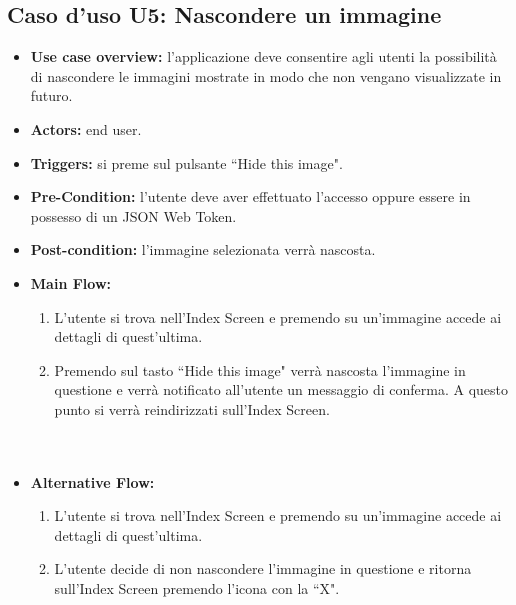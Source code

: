 \subsection*{Caso d'uso U5: Nascondere un immagine}
\begin{itemize}
    \item  \textbf{Use case overview:} l'applicazione deve consentire agli utenti la possibilit\`a di nascondere le immagini mostrate in modo che non vengano visualizzate in futuro.
    \item \textbf{Actors:} end user.
    \item \textbf{Triggers:} si preme sul pulsante ``Hide this image".
    \item \textbf{Pre-Condition:} l'utente deve aver effettuato l'accesso oppure essere in possesso di un JSON Web Token.
    \item \textbf{Post-condition:} l'immagine selezionata verr\`a nascosta.
    \item \textbf{Main Flow:} \begin{enumerate}
              \item L'utente si trova nell'Index Screen e premendo su un'immagine accede ai dettagli di quest'ultima.
              \item Premendo sul tasto ``Hide this image" verr\`a nascosta l'immagine in questione e verr\`a notificato all'utente un messaggio di conferma. A questo punto si verr\`a reindirizzati sull'Index Screen.\\ \\ \\

          \end{enumerate}
    \item \textbf{Alternative Flow:}\begin{enumerate}
              \item L'utente si trova nell'Index Screen e premendo su un'immagine accede ai dettagli di quest'ultima.
              \item L'utente decide di non nascondere l'immagine in questione e ritorna sull'Index Screen premendo l'icona con la ``X".

          \end{enumerate}
\end{itemize}

